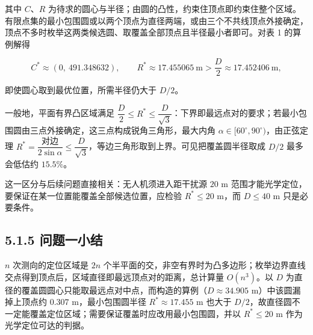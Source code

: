\documentclass[UTF8,a4paper,zihao=-4,fontset=fandol]{ctexart}
\begin{document}
其中 $C$、$R$ 为待求的圆心与半径；由圆的凸性，约束住顶点即约束住整个区域。有限点集的最小包围圆或以两个顶点为直径两端，或由三个不共线顶点外接确定，顶点不多时枚举这两类候选圆、取覆盖全部顶点且半径最小者即可。对表 1 的算例解得

\[
C^*\approx(0,\ 491.348632),\qquad
R^*\approx 17.455065\ \text{m}>\frac D2\approx 17.452406\ \text{m},
\]

即使圆心取到最优位置，所需半径仍大于 $D/2$。

一般地，平面有界凸区域满足 $\dfrac D2\le R^*\le\dfrac{D}{\sqrt 3}$：下界即最远点对的要求；若最小包围圆由三点外接确定，这三点构成锐角三角形，最大内角 $\alpha\in[60^\circ,90^\circ)$，由正弦定理 $R^*=\dfrac{\text{对边}}{2\sin\alpha}\le\dfrac{D}{\sqrt 3}$，等边三角形取到上界。可见把覆盖圆半径取成 $D/2$ 最多会低估约 $15.5\%$。

这一区分与后续问题直接相关：无人机须进入距干扰源 $20$ m 范围才能光学定位，要保证在某一位置能覆盖全部候选位置，应检验 $R^*\le 20$ m，而 $D\le 40$ m 只是必要条件。

\subsection*{5.1.5 问题一小结}

$n$ 次测向的定位区域是 $2n$ 个半平面的交，非空有界时为凸多边形；枚举边界直线交点得到顶点后，区域直径即最远顶点对的距离，总计算量 $O(n^3)$。以 $D$ 为直径的覆盖圆圆心只能取最远点对中点，而构造的算例（$D\approx 34.905$ m）中该圆漏掉上顶点约 $0.307$ m，最小包围圆半径 $R^*\approx 17.455$ m 也大于 $D/2$，故直径圆不一定能覆盖定位区域；需要保证覆盖时应改用最小包围圆，并以 $R^*\le 20$ m 作为光学定位可达的判据。
\end{document}
